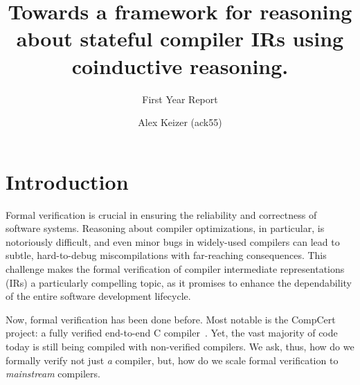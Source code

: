 \documentclass[a4paper]{scrartcl}
\begin{document}
\title{Towards a framework for reasoning about stateful compiler IRs 
using coinductive reasoning.}                                      
\subtitle{First Year Report}

\author{Alex Keizer \small{(ack55)}}
\date{}



\maketitle


\section{Introduction}

Formal verification is crucial in ensuring the reliability and
correctness of software systems. 
Reasoning about compiler optimizations, in particular, is notoriously difficult, 
and even minor bugs in widely-used compilers can lead to subtle, hard-to-debug miscompilations
with far-reaching consequences. 
This challenge makes the formal verification of compiler intermediate representations (IRs) a
particularly compelling topic, 
as it promises to enhance the dependability of the entire software development lifecycle.

Now, formal verification has been done before. Most notable is the
CompCert project: a fully verified end-to-end C compiler~\cite{leroyCompCertFormallyVerified}. Yet, the vast majority of
code today is still being compiled with non-verified compilers. We ask,
thus, how do we formally verify not just \emph{a} compiler, but, how do we
scale formal verification to \emph{mainstream} compilers.
\end{document}
